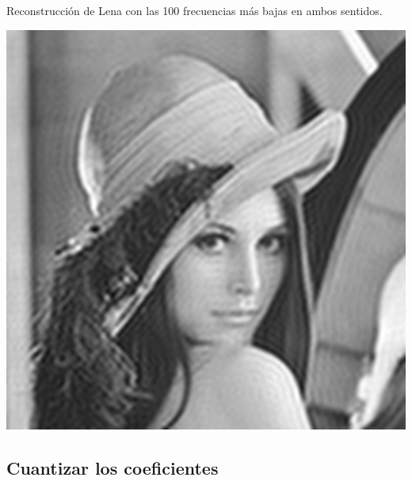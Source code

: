 \documentclass{beamer}
\begin{document}
\begin{frame}
    Reconstrucción de Lena con las 100 frecuencias más bajas en ambos sentidos.
    \begin{center}
        \includegraphics[scale=0.35]{fig/lenas_100frecuencias.png}
    \end{center}
\end{frame}

\subsection{Cuantizar los coeficientes}
\end{document}
